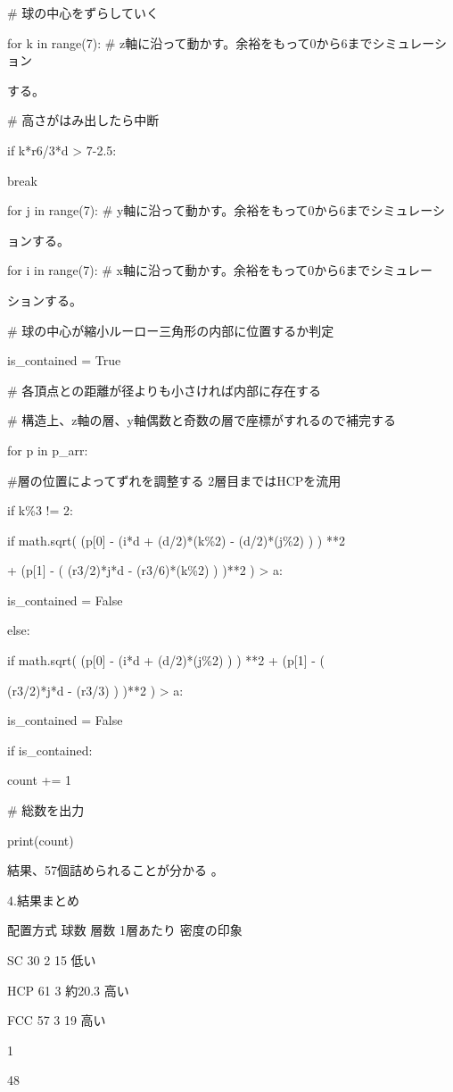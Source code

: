 \# 球の中心をずらしていく\par
for k in range(7): \# z軸に沿って動かす。余裕をもって0から6までシミュレーション\par
する。\par
\# 高さがはみ出したら中断\par
if k*r6/3*d > 7-2.5:\par
break\par
for j in range(7): \# y軸に沿って動かす。余裕をもって0から6までシミュレーシ\par
ョンする。\par
for i in range(7): \# x軸に沿って動かす。余裕をもって0から6までシミュレー\par
ションする。\par
\# 球の中心が縮小ルーロー三角形の内部に位置するか判定\par
is\_contained = True\par
\# 各頂点との距離が径よりも小さければ内部に存在する\par
\# 構造上、z軸の層、y軸偶数と奇数の層で座標がすれるので補完する\par
for p in p\_arr:\par
\#層の位置によってずれを調整する 2層目まではHCPを流用\par
if k\%3 != 2:\par
if math.sqrt( (p[0] - (i*d + (d/2)*(k\%2) - (d/2)*(j\%2) ) ) **2\par
+ (p[1] - ( (r3/2)*j*d - (r3/6)*(k\%2) ) )**2 ) > a:\par
is\_contained = False\par
else:\par
if math.sqrt( (p[0] - (i*d + (d/2)*(j\%2) ) ) **2 + (p[1] - (\par
(r3/2)*j*d - (r3/3) ) )**2 ) > a:\par
is\_contained = False\par
if is\_contained:\par
count += 1\par
\# 総数を出力\par
print(count)\par
結果、57個詰められることが分かる 。\par
4.結果まとめ\par
配置⽅式 球数 層数 1層あたり 密度の印象\par
SC 30 2 15 低い\par
HCP 61 3 約20.3 ⾼い\par
FCC 57 3 19 ⾼い\par
1\par
48\par

